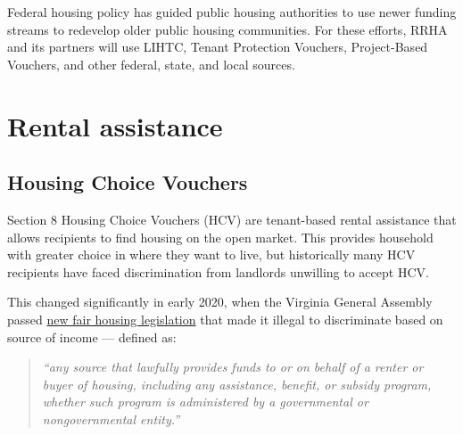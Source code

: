\documentclass[
  letterpaper,
  DIV=11,
  numbers=noendperiod]{scrreprt}
\begin{document}
\begin{tcolorbox}[enhanced jigsaw, colframe=quarto-callout-tip-color-frame, arc=.35mm, bottomrule=.15mm, colbacktitle=quarto-callout-tip-color!10!white, opacityback=0, left=2mm, rightrule=.15mm, title=\textcolor{quarto-callout-tip-color}{\faLightbulb}\hspace{0.5em}{Funding for Public Housing redevelopment}, colback=white, coltitle=black, toptitle=1mm, leftrule=.75mm, titlerule=0mm, breakable, opacitybacktitle=0.6, toprule=.15mm, bottomtitle=1mm]

Federal housing policy has guided public housing authorities to use
newer funding streams to redevelop older public housing communities. For
these efforts, RRHA and its partners will use LIHTC, Tenant Protection
Vouchers, Project-Based Vouchers, and other federal, state, and local
sources.

\end{tcolorbox}

\hypertarget{rental-assistance}{%
\section{Rental assistance}\label{rental-assistance}}

\hypertarget{housing-choice-vouchers}{%
\subsection{Housing Choice Vouchers}\label{housing-choice-vouchers}}

Section 8 Housing Choice Vouchers (HCV) are tenant-based rental
assistance that allows recipients to find housing on the open market.
This provides household with greater choice in where they want to live,
but historically many HCV recipients have faced discrimination from
landlords unwilling to accept HCV.

This changed significantly in early 2020, when the Virginia General
Assembly passed
\href{https://homeofva.org/get-help/fair-housing/source-of-funds/}{new
fair housing legislation} that made it illegal to discriminate based on
source of income --- defined as:

\begin{quote}
\emph{``any source that lawfully provides funds to or on behalf of a
renter or buyer of housing, including any assistance, benefit, or
subsidy program, whether such program is administered by a governmental
or nongovernmental entity.''}
\end{quote}
\end{document}
